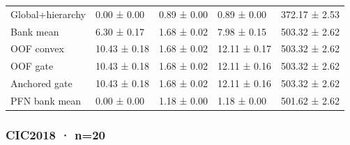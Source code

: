 \begin{longtable}
{}Global+\allowbreak{}hierarchy & 0.00 ± 0.00 & 0.89 ± 0.00 & 0.89 ± 0.00 & 372.17 ± 2.53 \\
{}Bank mean & 6.30 ± 0.17 & 1.68 ± 0.02 & 7.98 ± 0.15 & 503.32 ± 2.62 \\
{}OOF convex & 10.43 ± 0.18 & 1.68 ± 0.02 & 12.11 ± 0.17 & 503.32 ± 2.62 \\
{}OOF gate & 10.43 ± 0.18 & 1.68 ± 0.02 & 12.11 ± 0.16 & 503.32 ± 2.62 \\
{}Anchored gate & 10.43 ± 0.18 & 1.68 ± 0.02 & 12.11 ± 0.16 & 503.32 ± 2.62 \\
{}PFN bank mean & 0.00 ± 0.00 & 1.18 ± 0.00 & 1.18 ± 0.00 & 501.62 ± 2.62 \\
\bottomrule
\end{longtable}
\endgroup
\subsubsection{CIC2018 · n=\allowbreak{}20}
\begingroup
\footnotesize
